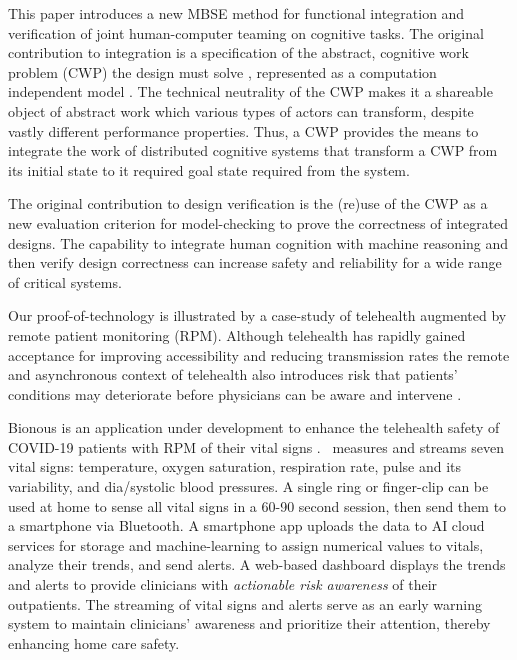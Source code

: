 This paper introduces a new MBSE method for functional integration and verification of joint human-computer teaming on cognitive tasks. 
The original contribution to integration is a specification of the abstract, cognitive work problem (CWP) the design must solve \cite{workflowmodel,workcentered,BERRY201615,chi2010}, represented as a computation independent model \cite{Garrido}.
The technical neutrality of the CWP makes it a shareable object of abstract work which various types of actors can transform, despite vastly different performance properties.
Thus, a CWP provides the means to integrate the work of distributed cognitive systems that transform a CWP from its initial state to it required goal state required from the system.

The original contribution to design verification is the (re)use of the CWP as a new evaluation criterion for model-checking to prove the correctness of integrated designs.
The capability to integrate human cognition with machine reasoning and then verify design correctness can increase safety and reliability for a wide range of critical systems.

Our proof-of-technology is illustrated by a case-study of telehealth augmented by remote patient monitoring (RPM). 
Although telehealth has rapidly gained acceptance for improving accessibility \cite{Medicare} and reducing transmission rates \cite{10.1093/jamia/ocaa067} the remote and asynchronous context of telehealth also introduces risk that patients' conditions may deteriorate before physicians can be aware and intervene \cite{10.1097/ALN.0000000000003578}.

Bionous \phware is an application under development to enhance the telehealth safety of COVID-19 patients with RPM of their vital signs \cite{Phware}.
\phware\ measures and streams seven vital signs: temperature, oxygen saturation, respiration rate, pulse and its variability, and dia/systolic blood pressures.
A single \phware ring or finger-clip can be used at home to sense all vital signs in a 60-90 second session, then send them to a smartphone via Bluetooth.
A smartphone app uploads the data to AI cloud services for storage and machine-learning to assign numerical values to vitals, analyze their trends, and send alerts.
A web-based dashboard displays the trends and alerts to provide clinicians with \emph{actionable risk awareness} of their outpatients.
The streaming of vital signs and alerts serve as an early warning system to maintain clinicians’ awareness and prioritize their attention, thereby enhancing home care safety.

